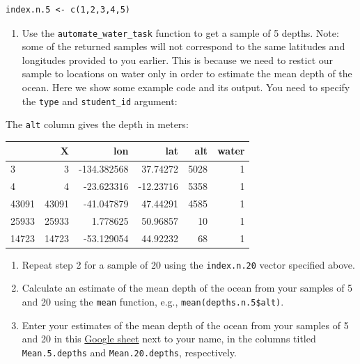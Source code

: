 \documentclass[letterpaper,10pt,twoside,]{pinp}
\providecommand{\tightlist}{%
  \setlength{\itemsep}{0pt}\setlength{\parskip}{0pt}}
\begin{document}
\begin{ShadedResult}
\begin{verbatim}
index.n.5 <- c(1,2,3,4,5)
\end{verbatim}
\end{ShadedResult}

\begin{enumerate}
\def\labelenumi{\arabic{enumi}.}
\setcounter{enumi}{1}
\tightlist
\item
  Use the \texttt{automate\_water\_task} function to get a sample of 5
  depths. Note: some of the returned samples will not correspond to the
  same latitudes and longitudes provided to you earlier. This is because
  we need to restict our sample to locations on water only in order to
  estimate the mean depth of the ocean. Here we show some example code
  and its output. You need to specify the \texttt{type} and
  \texttt{student\_id} argument:
\end{enumerate}

\begin{Shaded}
\begin{Highlighting}[]
\NormalTok{ <-}\StringTok{ }\NormalTok{(}\NormalTok{, } \NormalTok{, } \NormalTok{)}
\end{Highlighting}
\end{Shaded}

The \texttt{alt} column gives the depth in meters:

\begin{longtable}[]{@{}lrrrrr@{}}
\toprule
& X & lon & lat & alt & water\tabularnewline
\midrule
\endhead
3 & 3 & -134.382568 & 37.74272 & 5028 & 1\tabularnewline
4 & 4 & -23.623316 & -12.23716 & 5358 & 1\tabularnewline
43091 & 43091 & -41.047879 & 47.44291 & 4585 & 1\tabularnewline
25933 & 25933 & 1.778625 & 50.96857 & 10 & 1\tabularnewline
14723 & 14723 & -53.129054 & 44.92232 & 68 & 1\tabularnewline
\bottomrule
\end{longtable}

\begin{enumerate}
\def\labelenumi{\arabic{enumi}.}
\setcounter{enumi}{2}
\item
  Repeat step 2 for a sample of 20 using the \texttt{index.n.20} vector
  specified above.
\item
  Calculate an estimate of the mean depth of the ocean from your samples
  of 5 and 20 using the \texttt{mean} function, e.g.,
  \texttt{mean(depths.n.5\$alt)}.
\item
  Enter your estimates of the mean depth of the ocean from your samples
  of 5 and 20 in this
  \href{https://docs.google.com/spreadsheets/d/1Mnxeq9nQcTdQycZ7S_62fYFiNC5_a3fibsyodzfwO58/edit?usp=sharing}{Google
  sheet} next to your name, in the columns titled \texttt{Mean.5.depths}
  and \texttt{Mean.20.depths}, respectively.
\end{enumerate}
\end{document}

